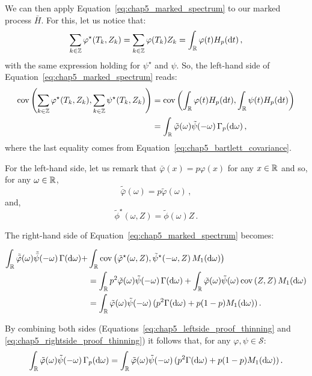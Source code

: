 \begin{subappendices}
        We can then apply Equation~\eqref{eq:chap5_marked_spectrum} to our marked process $\bar H$. 
        For this, let us notice that:
        \[
            \sum_{k\in{\mathbb Z}}{\varphi^\star(T_k, Z_k)} = \sum_{k\in{\mathbb Z}}{\varphi(T_k)Z_k} = \int_{{\mathbb R}}{\varphi(t) H_p({\mathrm{d}} t)}\,,
        \]
        with the same expression holding for $\psi^\star$ and $\psi$. 
        So, the left-hand side of Equation~\eqref{eq:chap5_marked_spectrum} reads:
        \begin{align}
            \operatorname{cov}\left(\sum_{k\in{\mathbb Z}}{\varphi^\star(T_k, Z_k)}, \sum_{k\in{\mathbb Z}}{\psi^\star(T_k, Z_k)}\right) &=
            \operatorname{cov}\left(\int_{{\mathbb R}}{\varphi(t) H_p({\mathrm{d}} t)}, \int_{{\mathbb R}}{\psi(t) H_p({\mathrm{d}} t)}\right) \nonumber\\
            &= \int_{{\mathbb R}}{\tilde \varphi(\omega)\tilde \psi(-\omega)\,\Gamma_p({\mathrm{d}}\omega)}\,,\label{eq:chap5_leftside_proof_thinning}
        \end{align}
        where the last equality comes from Equation~\eqref{eq:chap5_bartlett_covariance}.

        For the left-hand side, let us remark that $\bar \varphi(x) = p \varphi(x)$ for any $x\in{\mathbb R}$ and so, for any $\omega\in{\mathbb R}$,
        \[
            \tilde {\bar \varphi}(\omega) = p \tilde \varphi(\omega)\,,
        \]
        and,
        \[\tilde \phi^\star(\omega, Z) = \tilde \phi(\omega)Z\,.\]

        The right-hand side of Equation~\eqref{eq:chap5_marked_spectrum} becomes:

        \begin{align}
            \int_{{\mathbb R}}{\tilde {\bar\varphi} (\omega) \tilde{\bar \psi} (-\omega)\,\Gamma({\mathrm{d}} \omega)} 
        + &\int_{{\mathbb R}}{\operatorname{cov}\left( \tilde \varphi^\star(\omega, Z), \tilde \psi^\star (-\omega, Z)\,M_1({\mathrm{d}} \omega)\right)} \nonumber\\
        &= \int_{{\mathbb R}}{p^2 \tilde {\varphi} (\omega) \tilde{\psi} (-\omega)\,\Gamma({\mathrm{d}} \omega)} 
        + \int_{{\mathbb R}}{\tilde \varphi(\omega)\tilde \psi(\omega) \operatorname{cov}\left(Z,Z\right)M_1({\mathrm{d}} \omega)} \nonumber\\
        &= \int_{{\mathbb R}}{\tilde {\varphi} (\omega) \tilde{\psi} (-\omega)\,(p^2\Gamma({\mathrm{d}} \omega) + p(1-p) M_1({\mathrm{d}} \omega))}\,.\label{eq:chap5_rightside_proof_thinning}
        \end{align}

        By combining both sides (Equations~\eqref{eq:chap5_leftside_proof_thinning} and \eqref{eq:chap5_rightside_proof_thinning}) it follows that,
        for any $\varphi, \psi\in\mathcal{S}$:
        \[
            \int_{{\mathbb R}}{\tilde \varphi(\omega)\tilde \psi(-\omega)\,\Gamma_p({\mathrm{d}}\omega)} = \int_{{\mathbb R}}{\tilde {\varphi} (\omega) \tilde{\psi} (-\omega)\,(p^2\Gamma({\mathrm{d}} \omega) + p(1-p) M_1({\mathrm{d}} \omega))}\,.
        \]
        

\end{subappendices}
